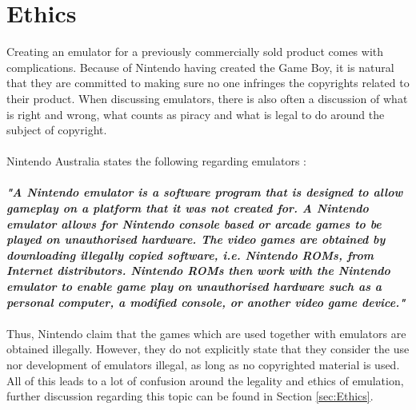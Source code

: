\section{Ethics}
\label{sec:introEthics}
Creating an emulator for a previously commercially sold product comes with complications. Because of Nintendo having created the Game Boy, it is natural that they are committed to making sure no one infringes the copyrights related to their product. When discussing emulators, there is also often a discussion of what is right and wrong, what counts as piracy and what is legal to do around the subject of copyright. 
\\\\
Nintendo Australia  states the following regarding emulators \cite{NintendoCopyright}:
\\\\
\textit{\textbf{"A Nintendo emulator is a software program that is designed to allow gameplay on a platform that it was not created for. A Nintendo emulator allows for Nintendo console based or arcade games to be played on unauthorised hardware. The video games are obtained by downloading illegally copied software, i.e. Nintendo ROMs, from Internet distributors. Nintendo ROMs then work with the Nintendo emulator to enable game play on unauthorised hardware such as a personal computer, a modified console, or another video game device."}}
\\\\
Thus, Nintendo claim that the games which are used together with emulators are obtained illegally. However, they do not explicitly state that they consider the use nor development of emulators illegal, as long as no copyrighted material is used. All of this leads to a lot of confusion around the legality and ethics of emulation, further discussion regarding this topic can be found in Section \ref{sec:Ethics}.
